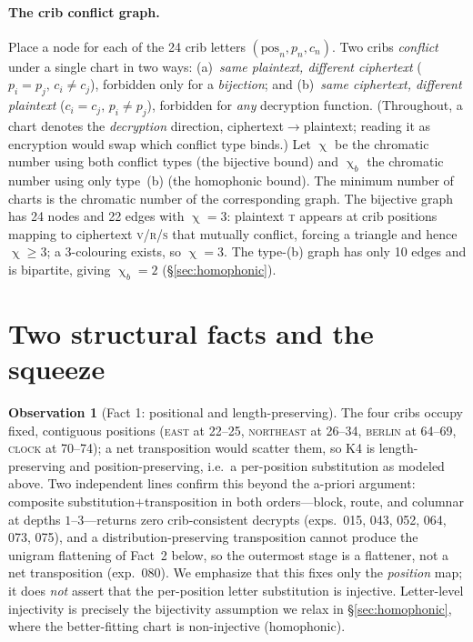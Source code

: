 \documentclass[11pt]{article}
\theoremstyle{plain}
\theoremstyle{definition}
\newtheorem{observation}{Observation}
\newcommand{\K}{\textsf{K4}}
\DeclareMathOperator{\chrom}{\chi}
\begin{document}
\paragraph{The crib conflict graph.}
Place a node for each of the 24 crib letters $(\text{pos}_n, p_n, c_n)$. Two cribs
\emph{conflict} under a single chart in two ways:
(a)~\emph{same plaintext, different ciphertext} ($p_i{=}p_j,\,c_i{\neq}c_j$),
forbidden only for a \emph{bijection}; and
(b)~\emph{same ciphertext, different plaintext} ($c_i{=}c_j,\,p_i{\neq}p_j$),
forbidden for \emph{any} decryption function. (Throughout, a chart denotes the
\emph{decryption} direction, ciphertext$\to$plaintext; reading it as encryption would
swap which conflict type binds.) Let $\chrom$ be the chromatic number
using both conflict types (the bijective bound) and $\chrom_b$ the chromatic number
using only type~(b) (the homophonic bound). The minimum number of charts is the
chromatic number of the corresponding graph. The bijective graph has 24 nodes and 22
edges with $\chrom=3$: plaintext \textsc{t} appears at crib positions mapping to
ciphertext \textsc{v}/\textsc{r}/\textsc{s} that mutually conflict, forcing a
triangle and hence $\chrom\ge3$; a 3-colouring exists, so $\chrom=3$. The type-(b)
graph has only 10 edges and is bipartite, giving $\chrom_b=2$ (\S\ref{sec:homophonic}).

\section{Two structural facts and the squeeze}\label{sec:squeeze}

\begin{observation}[Fact 1: positional and length-preserving]\label{obs:fact1}
The four cribs occupy fixed, contiguous positions (\textsc{east} at 22--25,
\textsc{northeast} at 26--34, \textsc{berlin} at 64--69, \textsc{clock} at 70--74);
a net transposition would scatter them, so \K{} is length-preserving and
position-preserving, i.e.\ a per-position substitution as modeled above. Two
independent lines confirm this beyond the a-priori argument: composite
substitution$+$transposition in both orders---block, route, and columnar at depths
$1$--$3$---returns zero crib-consistent decrypts (exps.~015, 043, 052, 064, 073, 075),
and a distribution-preserving transposition cannot produce the unigram flattening of
Fact~2 below, so the outermost stage is a flattener, not a net transposition
(exp.~080). We emphasize that this fixes only the \emph{position} map; it does
\emph{not} assert
that the per-position letter substitution is injective. Letter-level injectivity is
precisely the bijectivity assumption we relax in \S\ref{sec:homophonic}, where the
better-fitting chart is non-injective (homophonic).
\end{observation}
\end{document}
